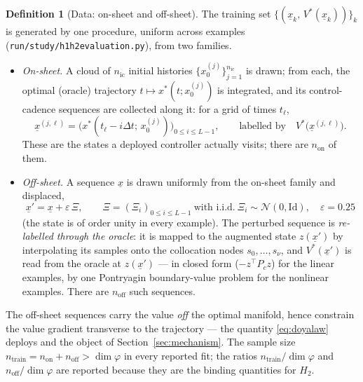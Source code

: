 \documentclass[11pt]{article}
\renewcommand{\_}{\discretionary{\textunderscore}{}{\textunderscore}}
\theoremstyle{plain}
\theoremstyle{definition}
\newtheorem{definition}[theorem]{Definition}
\begin{document}
\begin{definition}[Data: on-sheet and off-sheet]\label{def:datamode}
The training set $\{(\underline x_{k},\,V^{\ast}(\underline x_{k}))\}_{k}$ is generated by one procedure,
uniform across examples (\texttt{run/study/h1h2\_evaluation.py}), from two families.
\begin{itemize}
\item \emph{On-sheet.} A cloud of $n_{\mathrm{ic}}$ initial histories $\{x_{0}^{(j)}\}_{j=1}^{n_{\mathrm{ic}}}$
is drawn; from each, the optimal (oracle) trajectory $t\mapsto x^{\ast}(t;x_{0}^{(j)})$ is
integrated, and its control-cadence sequences are collected along it: for a grid of times
$t_{\ell}$,
\[
\underline x^{(j,\ell)}=\big(x^{\ast}(t_{\ell}-i\Delta t;\,x_{0}^{(j)})\big)_{0\le i\le L-1},
\qquad
\text{labelled by}\quad V^{\ast}\big(\underline x^{(j,\ell)}\big).
\]
These are the states a deployed controller actually visits; there are $n_{\mathrm{on}}$ of them.
\item \emph{Off-sheet.} A sequence $\underline x$ is drawn uniformly from the on-sheet family and
displaced,
\[
\underline x'=\underline x+\varepsilon\,\Xi,\qquad \Xi=(\Xi_{i})_{0\le i\le L-1}\ \text{with i.i.d.}\
\Xi_{i}\sim\mathcal N(0,\mathrm{Id}),\quad \varepsilon=0.25
\]
(the state is of order unity in every example). The perturbed sequence is \emph{re-labelled through
the oracle}: it is mapped to the augmented state $z(\underline x')$ by interpolating its samples onto
the collocation nodes $s_{0},\dots,s_{\nu}$, and $V^{\ast}(\underline x')$ is read from the
oracle at $z(\underline x')$ --- in closed form ($-z^{\top}P_{c}z$) for the linear examples, by one
Pontryagin boundary-value problem for the nonlinear examples. There are $n_{\mathrm{off}}$ such
sequences.
\end{itemize}
The off-sheet sequences carry the value \emph{off} the optimal manifold, hence constrain the value
gradient transverse to the trajectory --- the quantity \eqref{eq:doyalaw} deploys and the object of
Section~\ref{sec:mechanism}. The sample size
$n_{\text{train}}=n_{\mathrm{on}}+n_{\mathrm{off}}>\dim\varphi$ in every reported fit; the ratios
$n_{\text{train}}/\dim\varphi$ and $n_{\mathrm{off}}/\dim\varphi$ are reported because they are the
binding quantities for $H_2$.
\end{definition}
\end{document}
